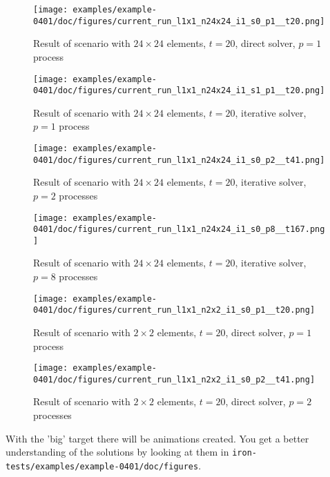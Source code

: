 \begin{figure}[ht]
  \centering
  \texttt{[image: examples/example-0401/doc/figures/current\_run\_l1x1\_n24x24\_i1\_s0\_p1\_\_t20.png]}
  \caption{Result of scenario with $24 \times 24$ elements, $t=20$, direct solver, $p=1$ process}
  \label{example-0401-current-run2-fig}
\end{figure}

\begin{figure}[ht]
  \centering
  \texttt{[image: examples/example-0401/doc/figures/current\_run\_l1x1\_n24x24\_i1\_s1\_p1\_\_t20.png]}
  \caption{Result of scenario with $24 \times 24$ elements, $t=20$, iterative solver, $p=1$ process}
  \label{example-0401-current-run3-fig}
\end{figure}

\begin{figure}[ht]
  \centering
  \texttt{[image: examples/example-0401/doc/figures/current\_run\_l1x1\_n24x24\_i1\_s0\_p2\_\_t41.png]}
  \caption{Result of scenario with $24 \times 24$ elements, $t=20$, iterative solver, $p=2$ processes}
  \label{example-0401-current-run4-fig}
\end{figure}

\begin{figure}[ht]
  \centering
  \texttt{[image: examples/example-0401/doc/figures/current\_run\_l1x1\_n24x24\_i1\_s0\_p8\_\_t167.png]}
  \caption{Result of scenario with $24 \times 24$ elements, $t=20$, iterative solver, $p=8$ processes}
  \label{example-0401-current-run5-fig}
\end{figure}

\begin{figure}[ht]
  \centering
  \texttt{[image: examples/example-0401/doc/figures/current\_run\_l1x1\_n2x2\_i1\_s0\_p1\_\_t20.png]}
  \caption{Result of scenario with $2 \times 2$ elements, $t=20$, direct solver, $p=1$ process}
  \label{example-0401-current-run6-fig}
\end{figure}

\begin{figure}[ht]
  \centering
  \texttt{[image: examples/example-0401/doc/figures/current\_run\_l1x1\_n2x2\_i1\_s0\_p2\_\_t41.png]}
  \caption{Result of scenario with $2 \times 2$ elements, $t=20$, direct solver, $p=2$ processes}
  \label{example-0401-current-run7-fig}
\end{figure}

With the 'big' target there will be animations created. You get a better understanding of the solutions by looking at them in \verb|iron-tests/examples/example-0401/doc/figures|.


